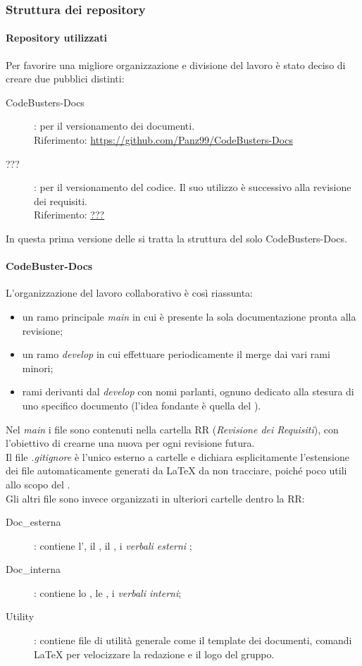 \subsubsection{Struttura dei repository}
\paragraph{Repository utilizzati}
Per favorire una migliore organizzazione e divisione del lavoro è stato deciso di creare due  pubblici distinti:
\begin{description}
	\item[CodeBusters-Docs] : per il versionamento dei documenti. \\
	Riferimento: \url{https://github.com/Panz99/CodeBusters-Docs}
	\item[???] : per il versionamento del codice. Il suo utilizzo è successivo alla revisione dei requisiti. \\
	Riferimento: \url{???}
\end{description}
In questa prima versione delle \NdPv si tratta la struttura del solo  CodeBusters-Docs. 

\paragraph{CodeBuster-Docs}
L'organizzazione del lavoro collaborativo è così riassunta:
\begin{itemize}
	\item un ramo principale \textit{main} in cui è presente la sola documentazione pronta alla revisione;	
	\item un ramo \textit{develop} in cui effettuare periodicamente il merge dai vari rami minori;
	\item rami derivanti dal \textit{develop} con nomi parlanti, ognuno dedicato alla stesura di uno specifico documento (l'idea fondante è quella del ).
\end{itemize}
Nel \textit{main} i file sono contenuti nella cartella RR (\textit{Revisione dei Requisiti}), con l'obiettivo di crearne una nuova per ogni revisione futura. \\
Il file \textit{.gitignore} è l'unico esterno a cartelle e dichiara esplicitamente l'estensione dei file automaticamente generati da \LaTeX{} da non tracciare, poiché poco utili allo scopo del . \\
Gli altri file sono invece organizzati in ulteriori cartelle dentro la RR:
\begin{description}
	\item[Doc\_esterna] : contiene l'\AdRv, il \PdPv, il \Glossariov, i \textit{verbali esterni} ;
	\item[Doc\_interna] : contiene lo \SdFv, le \NdPv, i \textit{verbali interni};
	\item[Utility] : contiene file di utilità generale come il template dei documenti, comandi \LaTeX{} per velocizzare la redazione e il logo del gruppo.
\end{description}

